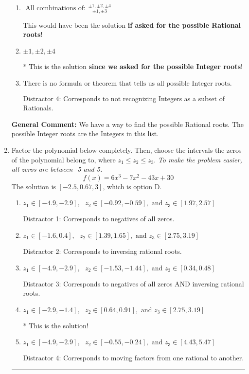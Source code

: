 \documentclass{extbook}[14pt]
\newcommand{\litem}[1]{\item #1

\rule{\textwidth}{0.4pt}}
\begin{document}
\begin{enumerate}
{\begin{enumerate}[label=\Alph*.]
 Distractor 3: Corresponds to the plus or minus of the inverse quotient (an/a0) of the factors. 
\item \( \text{ All combinations of: }\frac{\pm 1,\pm 2,\pm 4}{\pm 1,\pm 3} \)

This would have been the solution \textbf{if asked for the possible Rational roots}!
\item \( \pm 1,\pm 2,\pm 4 \)

* This is the solution \textbf{since we asked for the possible Integer roots}!
\item \( \text{There is no formula or theorem that tells us all possible Integer roots.} \)

 Distractor 4: Corresponds to not recognizing Integers as a subset of Rationals.
\end{enumerate}

\textbf{General Comment:} We have a way to find the possible Rational roots. The possible Integer roots are the Integers in this list.
}
\litem{
Factor the polynomial below completely. Then, choose the intervals the zeros of the polynomial belong to, where $z_1 \leq z_2 \leq z_3$. \textit{To make the problem easier, all zeros are between -5 and 5.}
\[ f(x) = 6x^{3} -7 x^{2} -43 x + 30 \]The solution is \( [-2.5, 0.67, 3] \), which is option D.\begin{enumerate}[label=\Alph*.]
\item \( z_1 \in [-4.9, -2.9], \text{   }  z_2 \in [-0.92, -0.59], \text{   and   } z_3 \in [1.97, 2.57] \)

 Distractor 1: Corresponds to negatives of all zeros.
\item \( z_1 \in [-1.6, 0.4], \text{   }  z_2 \in [1.39, 1.65], \text{   and   } z_3 \in [2.75, 3.19] \)

 Distractor 2: Corresponds to inversing rational roots.
\item \( z_1 \in [-4.9, -2.9], \text{   }  z_2 \in [-1.53, -1.44], \text{   and   } z_3 \in [0.34, 0.48] \)

 Distractor 3: Corresponds to negatives of all zeros AND inversing rational roots.
\item \( z_1 \in [-2.9, -1.4], \text{   }  z_2 \in [0.64, 0.91], \text{   and   } z_3 \in [2.75, 3.19] \)

* This is the solution!
\item \( z_1 \in [-4.9, -2.9], \text{   }  z_2 \in [-0.55, -0.24], \text{   and   } z_3 \in [4.43, 5.47] \)

 Distractor 4: Corresponds to moving factors from one rational to another.
\end{enumerate}

}
\end{enumerate}
\end{document}
